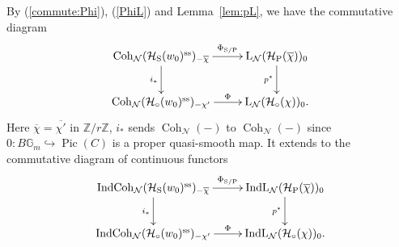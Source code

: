 \documentclass[11pt,oneside,a4paper,mathscr]{amsart}
\theoremstyle{definition}
\newcommand{\LL}{\operatorname{L}}
\newcommand{\Pic}{\operatorname{Pic}}
\newcommand{\cH}{\mathcal{H}}
\newcommand{\bgm}{B\mathbb{G}_m}
\newcommand{\Coh}{\operatorname{Coh}}
\newcommand{\IndCoh}{\operatorname{IndCoh}}
\newcommand{\IndL}{\operatorname{IndL}}
\newcommand{\rS}{\mathrm{S}}
\newcommand{\rP}{\mathrm{P}}
\begin{document}
By (\ref{commute:Phi}), (\ref{PhiL}) and Lemma~\ref{lem:pL}, 
we have the commutative diagram 
\begin{align}\label{commute:PhiL}
    \xymatrix{
\Coh_{\mathcal{N}}(\cH_{\rS}(w_0)^{\mathrm{ss}})_{-\overline{\chi}} \ar[r]^-{\Phi_{\rS/\rP}} \ar[d]_-{i_{*}} & \LL_{\mathcal{N}}(\cH_{\rP}(\overline{\chi}))_0 \ar[d]_-{p^*} \\
\Coh_{\mathcal{N}}(\cH_{\circ}(w_0)^{\mathrm{ss}})_{-\chi'} \ar[r]^-{\Phi} & \LL_{\mathcal{N}}(\cH_{\circ}(\chi))_0.
    }
\end{align}
Here $\overline{\chi}=\overline{\chi'}$ in $\mathbb{Z}/r\mathbb{Z}$, $i_{*}$ sends $\Coh_{\mathcal{N}}(-)$ to $\Coh_{\mathcal{N}}(-)$
since $0 \colon \bgm \hookrightarrow \Pic(C)$ is a proper quasi-smooth map. 
It extends to the commutative diagram of continuous functors 
\begin{align}\label{commute:PhiL2}
    \xymatrix{
\IndCoh_{\mathcal{N}}(\cH_{\rS}(w_0)^{\mathrm{ss}})_{-\overline{\chi}} \ar[r]^-{\Phi_{\rS/\rP}} \ar[d]_-{i_{*}} & \IndL_{\mathcal{N}}(\cH_{\rP}(\overline{\chi}))_0 \ar[d]_-{p^*} \\
\IndCoh_{\mathcal{N}}(\cH_{\circ}(w_0)^{\mathrm{ss}})_{-\chi'} \ar[r]^-{\Phi} & \IndL_{\mathcal{N}}(\cH_{\circ}(\chi))_0.
    }
\end{align}
\end{document}
